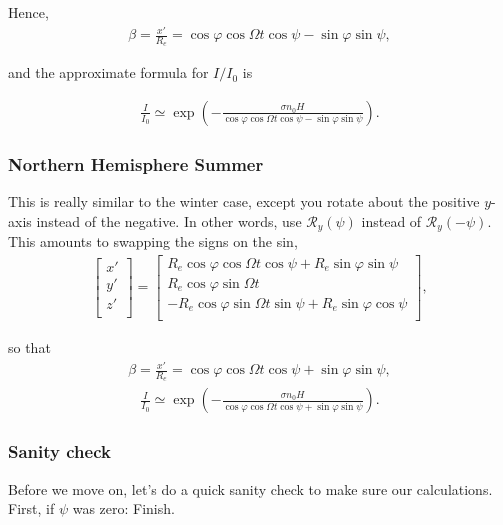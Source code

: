 \documentclass[10pt]{article}
\begin{document}
Hence,
\begin{align}
\beta = \frac{x'}{R_e} = \cos \varphi \cos \Omega t \cos \psi - \sin \varphi \sin \psi,
\end{align}

and the approximate formula for $I/I_0$ is

\begin{align} \label{eq:i-i0-approx-winter}
\boxed{ \frac{I}{I_0} \simeq \exp\left(-\frac{\sigma n_0 H}{\cos \varphi \cos \Omega t \cos \psi - \sin \varphi \sin \psi}\right). }
\end{align}

\subsubsection{Northern Hemisphere Summer}
This is really similar to the winter case, except you rotate about the positive $y$-axis instead of the negative. In other words, use $\mathcal{R}_y (\psi)$ instead of $\mathcal{R}_y(-\psi)$. This amounts to swapping the signs on the sin,
\begin{align}
\left[ \begin{array}{c}
	x' \\
	y' \\
	z' \\
\end{array} \right] =
\left[ \begin{array}{c}
	R_e \cos \varphi \cos \Omega t \cos \psi + R_e \sin \varphi \sin \psi \\
	R_e \cos \varphi \sin \Omega t \\
	-R_e \cos \varphi \sin \Omega t \sin \psi + R_e \sin \varphi \cos \psi \\
\end{array} \right],
\end{align}

so that
\begin{align}
\beta = \frac{x'}{R_e} = \cos \varphi \cos \Omega t \cos \psi + \sin \varphi \sin \psi,
\end{align}
\begin{align}
\boxed{ \frac{I}{I_0} \simeq \exp\left(-\frac{\sigma n_0 H}{\cos \varphi \cos \Omega t \cos \psi + \sin \varphi \sin \psi}\right). }
\end{align}

\subsubsection{Sanity check}
Before we move on, let's do a quick sanity check to make sure our calculations. First, if $\psi$ was zero:
Finish.
\end{document}
